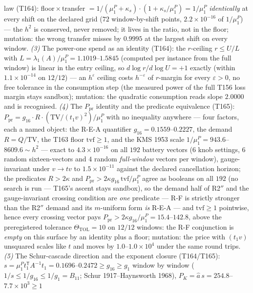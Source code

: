 law (T164): floor${}\times{}$transfer
$=1/(\mu^P_1+\kappa_s)\cdot(1+\kappa_s/\mu^P_1)=1/\mu^P_1$
\emph{identically} at every shift on the declared grid ($72$
window-by-shift points, $2.2\times10^{-16}$ of $1/\mu^P_1$) --- the
$h^2$ is conserved, never removed; it lives in the ratio, not in the
floor; mutation: the wrong transfer misses by $0.9995$ at the largest
shift on every window. \emph{(3)} The power-one spend as an identity
(T164): the $r$-ceiling $r\le U/L$ with
$L=\lambda_1(A)/\mu^P_1=1.1019$--$1.5845$ (computed per instance from
the full window) is linear in the entry ceiling, so
$d\log r/d\log U=+1$ exactly (within $1.1\times10^{-14}$ on $12/12$)
--- an $h^{\varepsilon}$ ceiling costs $h^{-\varepsilon}$ of
$r$-margin for every $\varepsilon>0$, no free tolerance in the
consumption step (the measured power of the full T156 loss margin
stays sandbox); mutation: the quadratic consumption reads slope
$2.0000$ and is recognised. \emph{(4)} The $P_{\mathrm{pr}}$ identity
and the predicate equivalence (T165):
$P_{\mathrm{pr}}=g_{16}\cdot R\cdot(\mathrm{TV}/(t_1v)^2)/\mu^P_1$
with no inequality anywhere --- four factors, each a named object: the
R-E-A quantifier $g_{16}=0.1559$--$0.2227$, the demand
$R=Q/\mathrm{TV}$, the T163 floor $\mathrm{tvf}\ge1$, and the KMS 1953
scale $1/\mu^P_1=943.6$--$8609.6\sim h^2$ --- exact to
$4.3\times10^{-16}$ on all $192$ battery vectors ($6$ knob settings,
$6$ random sixteen-vectors and $4$ random \emph{full-window} vectors
per window), gauge-invariant under $v\to tv$ to $1.5\times10^{-11}$
against the declared cancellation horizon; the predicates $R>2\kappa$
and $P_{\mathrm{pr}}>2\kappa g_{16}\,\mathrm{tvf}/\mu^P_1$ agree as
booleans on all $192$ (no search is run --- T165's ascent stays
sandbox), so the demand half of R2$''$ and the gauge-invariant
crossing condition are \emph{one} predicate --- R-F is strictly
stronger than the R2$''$ demand and its $m$-uniform form \emph{is}
R-E-A --- and $\mathrm{tvf}\ge1$ pointwise, hence every crossing
vector pays $P_{\mathrm{pr}}>2\kappa g_{16}/\mu^P_1=15.4$--$142.8$,
above the preregistered tolerance $\Theta_{\mathrm{TOL}}=10$ on
$12/12$ windows: the R-F conjunction is \emph{empty} on this surface
by an identity plus a floor; mutation: the price with $(t_1v)$
unsquared scales like $t$ and moves by $1.0$--$1.0\times10^{4}$ under
the same round trips. \emph{(5)} The Schur-cascade direction and the
exponent closure (T164/T165):
$s=\mu^P_1t_1^{\mathsf T}A^{-1}t_1=0.1696$--$0.2472\ge g_{16}\ge g_1$
window by window ($1/s\le1/g_{16}\le1/g_1=B_{11}$; Schur
1917--Haynsworth 1968), $P_K=\hat a\,s=254.8$--$7.7\times10^{3}\ge1$
